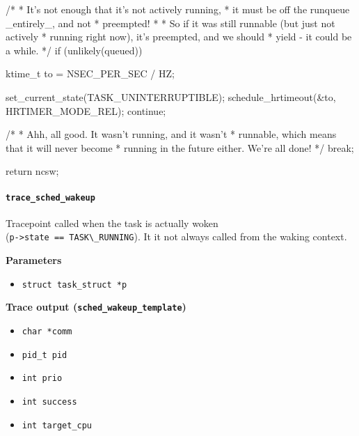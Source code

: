 \begin{code}
{{		/*
		 * It's not enough that it's not actively running,
		 * it must be off the runqueue _entirely_, and not
		 * preempted!
		 *
		 * So if it was still runnable (but just not actively
		 * running right now), it's preempted, and we should
		 * yield - it could be a while.
		 */
		if (unlikely(queued)) {
			ktime_t to = NSEC_PER_SEC / HZ;

			set_current_state(TASK_UNINTERRUPTIBLE);
			schedule_hrtimeout(&to, HRTIMER_MODE_REL);
			continue;
		}

		/*
		 * Ahh, all good. It wasn't running, and it wasn't
		 * runnable, which means that it will never become
		 * running in the future either. We're all done!
		 */
		break;
	}

	return ncsw;
}
\end{code}

\paragraph{\texttt{trace\_sched\_wakeup}}
Tracepoint called when the task is actually woken\\ (\verb|p->state == TASK\_RUNNING|). It it not always called from the waking context.

\textbf{Parameters}
\begin{itemize}
    \item \verb|struct task_struct *p|
\end{itemize}

\textbf{Trace output (\texttt{sched\_wakeup\_template})}
\begin{itemize}
    \item \verb|char *comm|
    \item \verb|pid_t pid|
    \item \verb|int prio|
    \item \verb|int success|
    \item \verb|int target_cpu|
\end{itemize}

